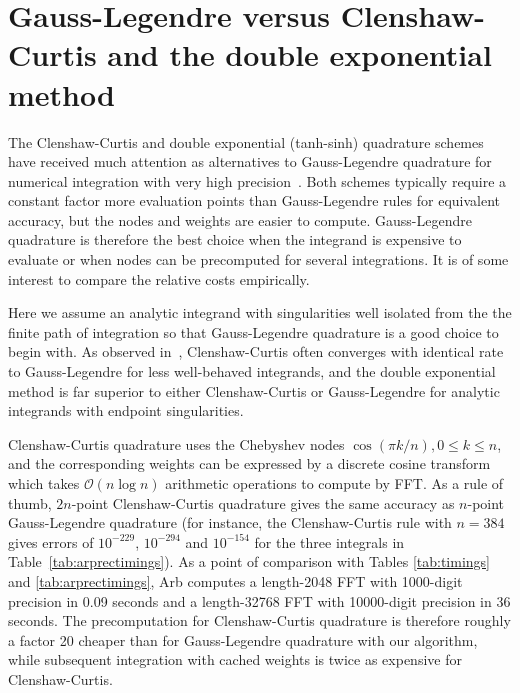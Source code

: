 \documentclass{siamart0216}
\newcommand{\OO}{\mathcal{O}}
\begin{document}
\section{Gauss-Legendre versus Clenshaw-Curtis and the double exponential method}

\label{sec:vsothers}

The Clenshaw-Curtis and double exponential (tanh-sinh) quadrature schemes
have received much attention as alternatives to Gauss-Legendre
quadrature for numerical integration with very high precision~\cite{bailey2011high,trefethen2008gauss}.
Both schemes
typically require a constant factor more evaluation points than Gauss-Legendre rules
for equivalent accuracy, but the nodes and weights are easier to compute.
Gauss-Legendre quadrature is therefore the best choice
when the integrand is expensive to evaluate or when nodes can
be precomputed for several integrations.
It is of some interest to compare the relative costs empirically.

Here we assume an analytic integrand with singularities well isolated from the
the finite path of integration so that Gauss-Legendre quadrature is a good
choice to begin with. As observed in~\cite{trefethen2008gauss},
Clenshaw-Curtis often converges with identical rate to Gauss-Legendre for
less well-behaved integrands,
and the double exponential method is far superior to either
Clenshaw-Curtis or Gauss-Legendre for
analytic integrands with endpoint singularities.

Clenshaw-Curtis quadrature uses the Chebyshev nodes
$\cos(\pi k / n), 0 \le k \le n$, and the corresponding weights can be expressed
by a discrete cosine transform which takes $\OO(n \log n)$
arithmetic operations to compute by FFT.
As a rule of thumb, $2n$-point Clenshaw-Curtis quadrature
gives the same accuracy as $n$-point Gauss-Legendre quadrature
(for instance, the Clenshaw-Curtis rule with $n = 384$ gives
errors of $10^{-229}$, $10^{-294}$ and $10^{-154}$ for the three
integrals in Table~\ref{tab:arprectimings}).
As a point of comparison with Tables \ref{tab:timings} and \ref{tab:arprectimings},
Arb computes a length-2048 FFT with 1000-digit precision
in 0.09 seconds and a length-32768 FFT with 10000-digit precision
in 36 seconds.
The precomputation for Clenshaw-Curtis quadrature is therefore
roughly a factor 20 cheaper than for Gauss-Legendre quadrature
with our algorithm, while subsequent integration with
cached weights is twice as expensive for Clenshaw-Curtis.
\end{document}
